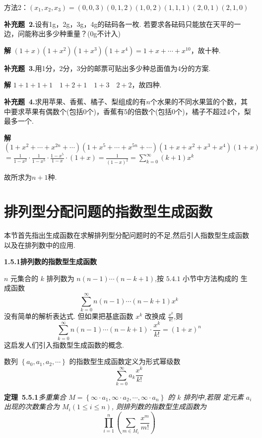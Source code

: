 \documentclass{report}
\begin{document}
方法2：$\left(x_{1}, x_{2}, x_{3}\right)=(0,0,3)(0, 1, 2)(1,0,2)(1,1,1)(2,0,1)(2,1,0)$

\textbf{补充题\ 2.}设有1g，2g，3g，4g的砝码各一枚. 若要求各砝码只能放在天平的一边，问能称出多少种重量？(0g不计入)

\textbf{解  }$(1+x)\left(1+x^{2}\right)\left(1+x^{3}\right)\left(1+x^{4}\right)=1+x+\cdots+x^{10}$，故十种.

\textbf{补充题\ 3.}用1分，2分，3分的邮票可贴出多少种总面值为4分的方案.

\textbf{解  }$1+1+1+1 \quad 1+2+1 \quad 1+3 \quad 2+2$，故四种.


\textbf{补充题\ 4.}求用苹果、香蕉、橘子、梨组成的有$n$个水果的不同水果篮的个数，其中要求苹果有偶数个(包括0个)，香蕉有5的倍数个(包括0个)，橘子不超过4个，梨最多一个.

\textbf{解  }$\left(1+x^{2}+\cdots+x^{2 n}+\cdots\right)\left(1+x^{5}+\cdots+x^{5 n}+\cdots\right)\left(1+x+x^{2}+x^{3}+x^{4}\right)(1+x)$
$=\frac{1}{1-x^{2}} \cdot \frac{1}{1-x^{5}} \cdot \frac{1-x^{5}}{1-x} \cdot(1+x)=\frac{1}{(1-x)^{2}}=\sum_{k=0}^{\infty}(k+1) x^{k}$

故所求为$n+1$种.


\section{排列型分配问题的指数型生成函数}
本节首先指出生成函数在求解排列型分配问题时的不足,然后引人指数型生成函数以及在排列数中的应用.

\textbf{1.5.1排列数的指数型生成函数}

$n$ 元集合的 $k$ 排列数为 $n(n-1) \cdots(n-k+1)$,按 $5.4 .1$ 小节中方法构成的 生成函数
$$
\sum_{k=0}^{\infty} n(n-1) \cdots(n-k+1) x^{k}
$$
没有简单的解析表达式. 但如果把基底函数 $x^{k}$ 改换成 $\frac{x^{k}}{k !}$,则
$$
\sum_{k=0}^{\infty} n(n-1) \cdots(n-k+1) \cdot \frac{x^{k}}{k !}=(1+x)^{n}
$$
这启发人们引入指数型生成函数的概念.

数列 $\left\{a_{0}, a_{1}, a_{2}, \cdots\right\}$ 的指数型生成函数定义为形式幂级数
$$
\sum_{k=0}^{\infty} a_{k} \frac{x^{k}}{k !}
$$

\noindent
\textbf{定理\ 5.5.1}\textsl{多重集合 $M=\left\{\infty \cdot a_{1}, \infty \cdot a_{2}, \cdots, \infty \cdot a_{n}\right\}$ 的 $k$ 排列中,若限 定元素 $a_{i}$ 出现的次数集合为 $M_{i}(1 \leqslant i \leqslant n)$, 则排列数的指数型生成函数为
$$
\prod_{i=1}^{n}\left(\sum_{m \in M_{i}} \frac{x^{m}}{m !}\right)
$$}
\end{document}
